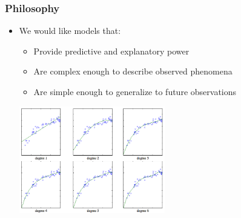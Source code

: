 \documentclass[xcolor=dvipsnames, 9pt]{beamer}
\begin{document}
\begin{frame}
  \frametitle{Philosophy}

    \begin{itemize}
      \item We would like models that:
        \begin{itemize}
          \item Provide predictive and explanatory power
          \item Are complex enough to describe observed phenomena
          \item Are simple enough to generalize to future observations
        \end{itemize}

    \begin{center}
      \includegraphics[width=0.5\textwidth]{regression.png}
    \end{center}

    \end{itemize}

\end{frame}
\end{document}
